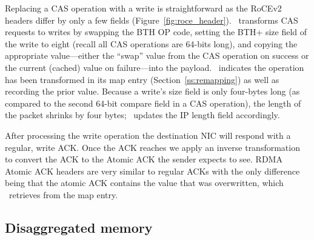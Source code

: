 Replacing a CAS operation with a write is straightforward as the
RoCEv2 headers differ by only a few fields
(Figure~\ref{fig:roce_header}).  \sword\ transforms CAS requests to
writes by swapping the BTH OP code, setting the BTH+ size field of the
write to eight (recall all CAS operations are 64-bits long), and
copying the appropriate value---either the ``swap'' value from the CAS
operation on success or the current (cached) value on failure---into
the payload.  \sword\ indicates the operation has been transformed in
its map entry (Section~\ref{ss:remapping}) as well as recording the prior value.
Because a write's size field is only four-bytes long (as compared to
the second 64-bit compare field in a CAS operation), the length of the
packet shrinks by four bytes; \sword\ updates the IP length field
accordingly.



After processing the write operation the destination NIC will respond
with a regular, write ACK. Once the ACK reaches {\sword} we apply an
inverse transformation to convert the ACK to the Atomic ACK the sender
expects to see.  RDMA Atomic ACK headers are very similar to regular
ACKs with the only difference being that the atomic ACK contains the
value that was overwritten, which \sword\ retrieves from the map
entry.


\subsection{Disaggregated memory}

